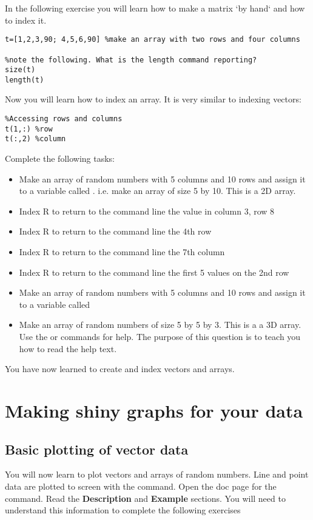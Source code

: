 \documentclass{article}
\begin{document}
In the following exercise you will learn how to make a matrix `by hand` and how to index it.

\begin{lstlisting}
t=[1,2,3,90; 4,5,6,90] %make an array with two rows and four columns 

%note the following. What is the length command reporting?
size(t)
length(t)
\end{lstlisting}

Now you will learn how to index an array. It is very similar to indexing vectors:
\begin{lstlisting}
%Accessing rows and columns
t(1,:) %row
t(:,2) %column
\end{lstlisting}

Complete the following tasks:
\begin{itemize}
\item Make an array of random numbers with 5 columns and 10 rows and assign it to a variable called . i.e.
make an array of size 5 by 10. This is a 2D array.
\item Index R to return to the command line the value in column 3, row 8
\item Index R to return to the command line the 4th row
\item Index R to return to the command line the 7th column
\item Index R to return to the command line the first 5 values on the 2nd row
\item Make an array of random numbers  with 5 columns and 10 rows and assign it to a variable called 
\item Make an array of random numbers of size 5 by 5 by 3. This is a a 3D array. Use the  or  commands
for help. The purpose of this question is to teach you how to read the help text.
\end{itemize}

You have now learned to create and index vectors and arrays. 


\section{Making shiny graphs for your data}

\subsection*{Basic plotting of vector data}
You will now learn to plot vectors and arrays of random numbers. Line and point data are plotted to screen
with the  command. Open the doc page for the  command. Read the \textbf{Description} and
\textbf{Example} sections. You will need to understand this information to complete the following exercises
\end{document}
